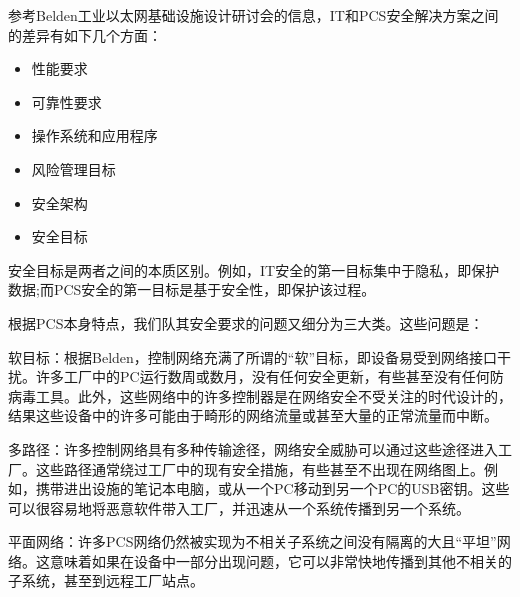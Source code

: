 参考Belden工业以太网基础设施设计研讨会的信息，IT和PCS安全解决方案之间的差异有如下几个方面：
\begin{itemize}
	\item 性能要求
	\item 可靠性要求
	\item 操作系统和应用程序
	\item 风险管理目标
	\item 安全架构
	\item 安全目标
\end{itemize}


安全目标是两者之间的本质区别。例如，IT安全的第一目标集中于隐私，即保护数据;而PCS安全的第一目标是基于安全性，即保护该过程。

根据PCS本身特点，我们队其安全要求的问题又细分为三大类。这些问题是：

软目标：根据Belden，控制网络充满了所谓的“软”目标，即设备易受到网络接口干扰。许多工厂中的PC运行数周或数月，没有任何安全更新，有些甚至没有任何防病毒工具。此外，这些网络中的许多控制器是在网络安全不受关注的时代设计的，结果这些设备中的许多可能由于畸形的网络流量或甚至大量的正常流量而中断。

多路径：许多控制网络具有多种传输途径，网络安全威胁可以通过这些途径进入工厂。这些路径通常绕过工厂中的现有安全措施，有些甚至不出现在网络图上。例如，携带进出设施的笔记本电脑，或从一个PC移动到另一个PC的USB密钥。这些可以很容易地将恶意软件带入工厂，并迅速从一个系统传播到另一个系统。

平面网络：许多PCS网络仍然被实现为不相关子系统之间没有隔离的大且“平坦”网络。这意味着如果在设备中一部分出现问题，它可以非常快地传播到其他不相关的子系统，甚至到远程工厂站点。

